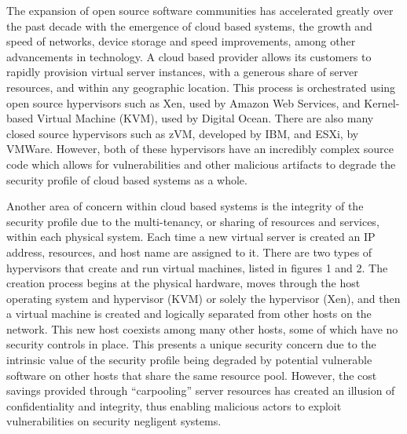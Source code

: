 \documentclass[./main.tex]{subfiles}
\begin{document}
 The expansion of open source software communities has accelerated greatly over the past decade with the emergence of cloud based systems, the growth and speed of networks, device storage and speed improvements, among other advancements in technology. A cloud based provider allows its customers to rapidly provision virtual server instances, with a generous share of server resources, and within any geographic location. This process is orchestrated using open source hypervisors such as Xen, used by Amazon Web Services, and Kernel-based Virtual Machine (KVM), used by Digital Ocean. There are also many closed source hypervisors such as zVM, developed by IBM, and ESXi, by VMWare. However, both of these hypervisors have an incredibly complex source code which allows for vulnerabilities and other malicious artifacts to degrade the security profile of cloud based systems as a whole.

 Another area of concern within cloud based systems is the integrity of the security profile due to the multi-tenancy, or sharing of resources and services, within each physical system. Each time a new virtual server is created an IP address, resources, and host name are assigned to it. There are two types of hypervisors that create and run virtual machines, listed in figures 1 and 2. The creation process begins at the physical hardware, moves through the host operating system and hypervisor (KVM) or solely the hypervisor (Xen), and then a virtual machine is created and logically separated from other hosts on the network. This new host coexists among many other hosts, some of which have no security controls in place. This presents a unique security concern due to the intrinsic value of the security profile being degraded by potential vulnerable software on other hosts that share the same resource pool. However, the cost savings provided through “carpooling” server resources has created an illusion of confidentiality and integrity, thus enabling malicious actors to exploit vulnerabilities on security negligent systems.
\end{document}
